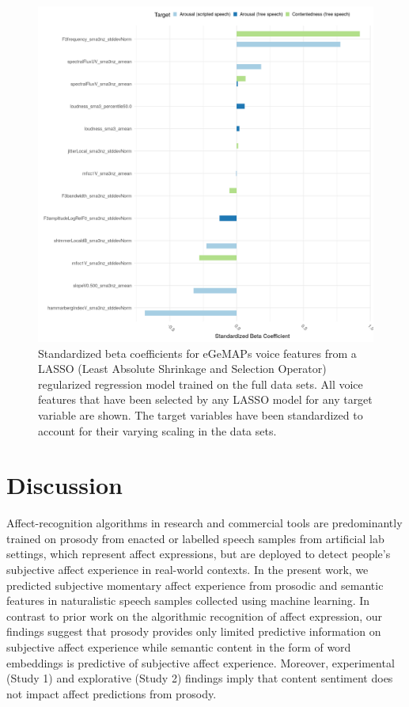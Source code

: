 \documentclass[
  english,
  man,floatsintext]{apa6}
\begin{document}
\begin{figure}

{\centering \includegraphics[width=1\linewidth,height=1\textheight]{../figures/betas_plot} 

}

\caption[LASSO betas]{Standardized beta coefficients for eGeMAPs voice features from a LASSO (Least Absolute Shrinkage and Selection Operator) regularized regression model trained on the full data sets. All voice features that have been selected by any LASSO model for any target variable are shown. The target variables have been standardized to account for their varying scaling in the data sets.}\label{fig:lassobetas}
\end{figure}
\newpage

\hypertarget{discussion}{%
\section{Discussion}\label{discussion}}

Affect-recognition algorithms in research and commercial tools are predominantly trained on prosody from enacted or labelled speech samples from artificial lab settings, which represent affect expressions, but are deployed to detect people's subjective affect experience in real-world contexts. In the present work, we predicted subjective momentary affect experience from prosodic and semantic features in naturalistic speech samples collected using machine learning. In contrast to prior work on the algorithmic recognition of affect expression, our findings suggest that prosody provides only limited predictive information on subjective affect experience while semantic content in the form of word embeddings is predictive of subjective affect experience. Moreover, experimental (Study 1) and explorative (Study 2) findings imply that content sentiment does not impact affect predictions from prosody.
\end{document}
